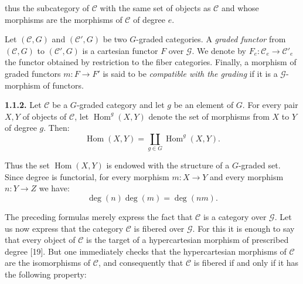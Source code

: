 %
%
thus the subcategory of $\mathcal C$ with the same set of objects as
$\mathcal C$ and whose morphisms are the morphisms of $\mathcal C$ of
degree $e$.

Let $(\mathcal C,G)$ and $(\mathcal C',G)$ be two $G$-graded categories.
A \emph{graded functor} from $(\mathcal C,G)$ to $(\mathcal C',G)$ is a
cartesian functor $F$ over $\mathcal G$. We denote by
$F_e\colon\mathcal C_e\to\mathcal C'_e$ the functor obtained by restriction
to the fiber categories.
Finally, a morphism of graded functors $m\colon F\to F'$ is said to be
\emph{compatible with the grading} if it is a
$\mathcal G$-morphism of functors.

\noindent\textbf{1.1.2.}\quad
Let $\mathcal C$ be a $G$-graded category and let $g$ be an element of
$G$. For every pair $X,Y$ of objects of $\mathcal C$, let
%
$\operatorname{Hom}^{g}(X,Y)$ denote the set of morphisms from $X$ to $Y$
of degree $g$. Then:
\begingroup
\makeatletter
\tagsleft@true
\let\veqno\@@leqno
\makeatother
\begin{equation}
  \operatorname{Hom}(X,Y)
  =\coprod_{g\in G}\operatorname{Hom}^{g}(X,Y).
  \tag{1.1.2.1}
\end{equation}
\endgroup

Thus the set $\operatorname{Hom}(X,Y)$ is endowed with the structure of a
$G$-graded set. Since degree is functorial, for every morphism
$m\colon X\to Y$ and every morphism $n\colon Y\to Z$ we have:
\begin{equation}
  \deg(n)\deg(m)=\deg(nm).
  \tag{1.1.2.2}
\end{equation}

The preceding formulas merely express the fact that $\mathcal C$ is a
category over $\mathcal G$. Let us now express that the category
$\mathcal C$ is fibered over $\mathcal G$. For this it is enough to say
that every object of $\mathcal C$ is the target of a hypercartesian
morphism of prescribed degree [19]. But one immediately checks that the
hypercartesian morphisms of $\mathcal C$ are the isomorphisms of
$\mathcal C$, and consequently that $\mathcal C$ is fibered if and only if
it has the following property:

